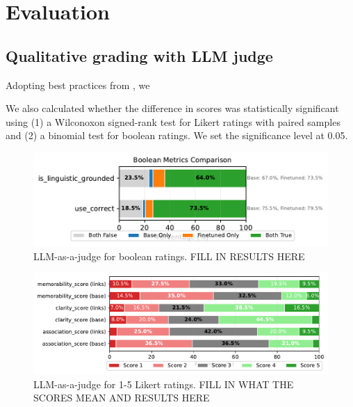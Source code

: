 \section{Evaluation} \label{sec:evaluation}

\subsection{Qualitative grading with LLM judge} \label{sec:qualitative-llm-judge}

Adopting best practices from \citet{guSurveyLLMasaJudge2025}, we

We also calculated whether the difference in scores was statistically significant using (1) a Wilconoxon signed-rank test for Likert ratings with paired samples and (2) a binomial test for boolean ratings. We set the significance level at 0.05.


\begin{figure}[htb]
  \centering
  \includegraphics[width=\linewidth]{figures/boolean_comparison.pdf}
  \caption{LLM-as-a-judge for boolean ratings. FILL IN RESULTS HERE}
  \label{fig:llm-judge-boolean}
\end{figure}

\begin{figure}[htb]
  \centering
  \includegraphics[width=\linewidth]{figures/likert_distribution.pdf}
  \caption{LLM-as-a-judge for 1-5 Likert ratings. FILL IN WHAT THE SCORES MEAN AND RESULTS HERE}
  \label{fig:llm-judge-likert}
\end{figure}

